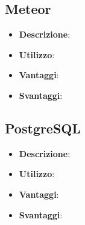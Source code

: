 \subsection{Meteor}
\begin{itemize}
	\item \textbf{Descrizione}:
	\item \textbf{Utilizzo}:
	\item \textbf{Vantaggi}:
	\item \textbf{Svantaggi}:
\end{itemize}

\subsection{PostgreSQL}
\begin{itemize}
	\item \textbf{Descrizione}:
	\item \textbf{Utilizzo}:
	\item \textbf{Vantaggi}:
	\item \textbf{Svantaggi}:
\end{itemize}



